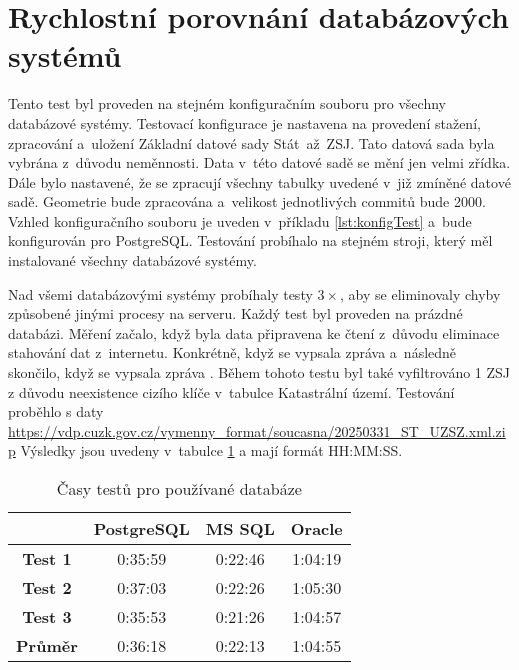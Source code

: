 \section{Rychlostní porovnání databázových systémů}
Tento test byl proveden na stejném konfiguračním souboru pro všechny databázové systémy.
Testovací konfigurace je nastavena na provedení stažení, zpracování a~uložení Základní datové sady Stát~až~ZSJ.
Tato datová sada byla vybrána z~důvodu neměnnosti.
Data v~této datové sadě se mění jen velmi zřídka.
Dále bylo nastavené, že se zpracují všechny tabulky uvedené v~již zmíněné datové sadě.
Geometrie bude zpracována a~velikost jednotlivých commitů bude 2000.
Vzhled konfiguračního souboru je uveden v~příkladu \ref{lst:konfigTest} a~bude konfigurován pro PostgreSQL.
Testování probíhalo na stejném stroji, který měl instalované všechny databázové systémy.

Nad všemi databázovými systémy probíhaly testy \(3\times\), aby se eliminovaly chyby způsobené jinými procesy na serveru.
Každý test byl proveden na prázdné databázi.
Měření začalo, když byla data připravena ke čtení z~důvodu eliminace stahování dat z~internetu.
Konkrétně, když se vypsala zpráva  a~následně skončilo, když se
vypsala zpráva .
Během tohoto testu byl také vyfiltrováno 1 ZSJ z důvodu neexistence cizího klíče v~tabulce Katastrální území.
Testování proběhlo s daty \url{https://vdp.cuzk.gov.cz/vymenny_format/soucasna/20250331_ST_UZSZ.xml.zip}
Výsledky jsou uvedeny v~tabulce \ref{tab:test1} a mají formát HH:MM:SS.

\begin{table}[!h]
  \centering
  \caption{Časy testů pro používané databáze}
  \label{tab:test1}
  \begin{tabular}{|c|c|c|c|}
  \hline
                  & \textbf{PostgreSQL} & \textbf{MS SQL} & \textbf{Oracle} \\ \hline
  \textbf{Test 1} & 0:35:59             & 0:22:46         & 1:04:19         \\ \hline
  \textbf{Test 2} & 0:37:03             & 0:22:26         & 1:05:30         \\ \hline
  \textbf{Test 3} & 0:35:53             & 0:21:26         & 1:04:57         \\ \hline
  \textbf{Průměr} & 0:36:18             & 0:22:13         & 1:04:55         \\ \hline
  \end{tabular}
\end{table}

